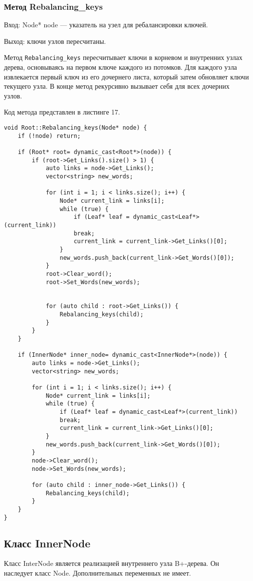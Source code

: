 \documentclass[10pt,a4paper,final]{article} %
\begin{document}
\subsubsection{Метод Rebalancing\_keys}
Вход: Node* node — указатель на узел для ребалансировки ключей. \par
Выход: ключи узлов пересчитаны. \par
\par Метод \texttt{Rebalancing\_keys} пересчитывает ключи в корневом и внутренних узлах дерева, основываясь на первом ключе каждого из потомков. Для каждого узла извлекается первый ключ из его дочернего листа, который затем обновляет ключи текущего узла. В конце метод рекурсивно вызывает себя для всех дочерних узлов.

Код метода представлен в листинге 17. \begin{lstlisting}[label=rebalancingKeysMethod, caption = Метод Rebalancing\_keys] 
void Root::Rebalancing_keys(Node* node) {
	if (!node) return;
	
	if (Root* root= dynamic_cast<Root*>(node)) {
		if (root->Get_Links().size() > 1) {
			auto links = node->Get_Links();
			vector<string> new_words;
			
			for (int i = 1; i < links.size(); i++) {
				Node* current_link = links[i];
				while (true) {
					if (Leaf* leaf = dynamic_cast<Leaf*>(current_link))
					break;
					current_link = current_link->Get_Links()[0];
				}
				new_words.push_back(current_link->Get_Words()[0]);
			}
			root->Clear_word();
			root->Set_Words(new_words);
			
			
			for (auto child : root->Get_Links()) {
				Rebalancing_keys(child);
			}
		}
	}
	
	if (InnerNode* inner_node= dynamic_cast<InnerNode*>(node)) {
		auto links = node->Get_Links();
		vector<string> new_words;
		
		for (int i = 1; i < links.size(); i++) {
			Node* current_link = links[i];
			while (true) {
				if (Leaf* leaf = dynamic_cast<Leaf*>(current_link))
				break;
				current_link = current_link->Get_Links()[0];
			}
			new_words.push_back(current_link->Get_Words()[0]);
		}
		node->Clear_word();
		node->Set_Words(new_words);
		
		for (auto child : inner_node->Get_Links()) {
			Rebalancing_keys(child);
		}
	}
}\end{lstlisting}


\subsection{Класс InnerNode}
Класс InterNode является реализацией внутреннего узла B+-дерева. Он наследует класс Node. Дополнительных переменных не имеет.
\end{document}
